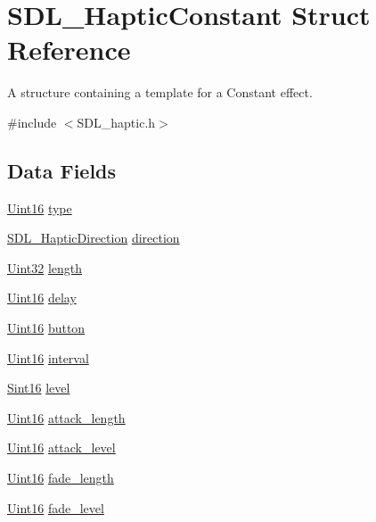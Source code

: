 \hypertarget{struct_s_d_l___haptic_constant}{}\section{S\+D\+L\+\_\+\+Haptic\+Constant Struct Reference}
\label{struct_s_d_l___haptic_constant}


A structure containing a template for a Constant effect.  




{\ttfamily \#include $<$S\+D\+L\+\_\+haptic.\+h$>$}

\subsection*{Data Fields}
\begin{DoxyCompactItemize}
\item 
\hyperlink{_s_d_l__stdinc_8h_a31fcc0a076c9068668173ee26d33e42b}{Uint16} \hyperlink{struct_s_d_l___haptic_constant_a8db4a3e9f29940892f2773bca31c74e1}{type}
\item 
\hyperlink{struct_s_d_l___haptic_direction}{S\+D\+L\+\_\+\+Haptic\+Direction} \hyperlink{struct_s_d_l___haptic_constant_a9fe6fc39233e26d6c0705ae77e43d96c}{direction}
\item 
\hyperlink{_s_d_l__stdinc_8h_add440eff171ea5f55cb00c4a9ab8672d}{Uint32} \hyperlink{struct_s_d_l___haptic_constant_afbde362d49894774c8b9c9e85ac0a913}{length}
\item 
\hyperlink{_s_d_l__stdinc_8h_a31fcc0a076c9068668173ee26d33e42b}{Uint16} \hyperlink{struct_s_d_l___haptic_constant_a069408e960d0f2ba482421f2dd2ec003}{delay}
\item 
\hyperlink{_s_d_l__stdinc_8h_a31fcc0a076c9068668173ee26d33e42b}{Uint16} \hyperlink{struct_s_d_l___haptic_constant_a9dab31b41646c5d046ea33d0cfb3794a}{button}
\item 
\hyperlink{_s_d_l__stdinc_8h_a31fcc0a076c9068668173ee26d33e42b}{Uint16} \hyperlink{struct_s_d_l___haptic_constant_a263a60513b1bdb1e91b28bd2e128e9d4}{interval}
\item 
\hyperlink{_s_d_l__stdinc_8h_a9d0257032c0e146ab6121bf0122712f5}{Sint16} \hyperlink{struct_s_d_l___haptic_constant_adf1b5bc92984a2dbc520fb3469f40393}{level}
\item 
\hyperlink{_s_d_l__stdinc_8h_a31fcc0a076c9068668173ee26d33e42b}{Uint16} \hyperlink{struct_s_d_l___haptic_constant_ac1af5d594e082747b14fa520f74764c0}{attack\+\_\+length}
\item 
\hyperlink{_s_d_l__stdinc_8h_a31fcc0a076c9068668173ee26d33e42b}{Uint16} \hyperlink{struct_s_d_l___haptic_constant_accde1dae084b0e3b5027c7731cde9080}{attack\+\_\+level}
\item 
\hyperlink{_s_d_l__stdinc_8h_a31fcc0a076c9068668173ee26d33e42b}{Uint16} \hyperlink{struct_s_d_l___haptic_constant_a576ff5ee847dd20a8f1c4a69ce09ba79}{fade\+\_\+length}
\item 
\hyperlink{_s_d_l__stdinc_8h_a31fcc0a076c9068668173ee26d33e42b}{Uint16} \hyperlink{struct_s_d_l___haptic_constant_a03b48c5ffd631a0f35741e1aa7f482dd}{fade\+\_\+level}
\end{DoxyCompactItemize}


